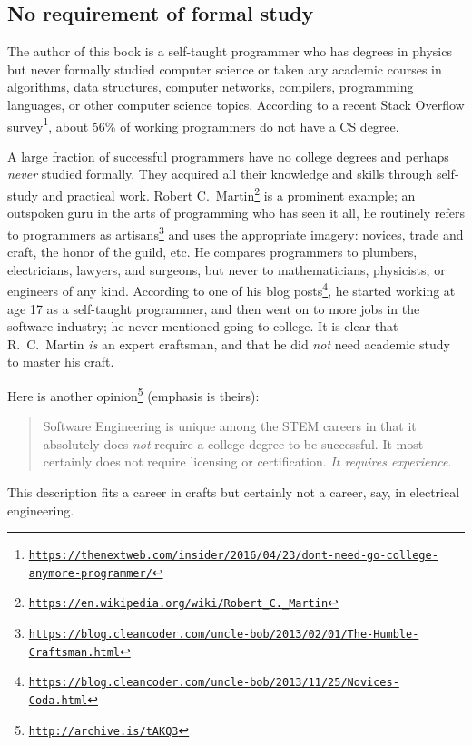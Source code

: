 \subsection{No requirement of formal study }

The author of this book is a self-taught programmer who has degrees
in physics but never formally studied computer science or taken any
academic courses in algorithms, data structures, computer networks,
compilers, programming languages, or other computer science topics.
According to a recent Stack Overflow survey\footnote{\texttt{\href{https://thenextweb.com/insider/2016/04/23/dont-need-go-college-anymore-programmer/}{https://thenextweb.com/insider/2016/04/23/dont-need-go-college-anymore-programmer/}}},
about 56\% of working programmers do not have a CS degree. 

A large fraction of successful programmers have no college degrees
and perhaps \emph{never} studied formally. They acquired all their
knowledge and skills through self-study and practical work. Robert
C.~Martin\footnote{\texttt{\href{https://en.wikipedia.org/wiki/Robert_C._Martin}{https://en.wikipedia.org/wiki/Robert\_C.\_Martin}}}
is a prominent example; an outspoken guru in the arts of programming
who has seen it all, he routinely refers to programmers as artisans\footnote{\texttt{\href{https://blog.cleancoder.com/uncle-bob/2013/02/01/The-Humble-Craftsman.html}{https://blog.cleancoder.com/uncle-bob/2013/02/01/The-Humble-Craftsman.html}}}
and uses the appropriate imagery: novices, trade and craft, the honor
of the guild, etc. He compares programmers to plumbers, electricians,
lawyers, and surgeons, but never to mathematicians, physicists, or
engineers of any kind. According to one of his blog posts\footnote{\texttt{\href{https://blog.cleancoder.com/uncle-bob/2013/11/25/Novices-Coda.html}{https://blog.cleancoder.com/uncle-bob/2013/11/25/Novices-Coda.html}}},
he started working at age 17 as a self-taught programmer, and then
went on to more jobs in the software industry; he never mentioned
going to college. It is clear that R.~C.~Martin \emph{is} an expert
craftsman, and that he did \emph{not} need academic study to master
his craft.

Here is another opinion\footnote{\texttt{\href{http://archive.is/tAKQ3}{http://archive.is/tAKQ3}}}
(emphasis is theirs):
\begin{quotation}
{\small{}Software Engineering is unique among the STEM careers in
that it absolutely does }\emph{\small{}not}{\small{} require a college
degree to be successful. It most certainly does not require licensing
or certification. }\emph{\small{}It requires experience}{\small{}.}{\small\par}
\end{quotation}
This description fits a career in crafts \textemdash{} but certainly
not a career, say, in electrical engineering.

